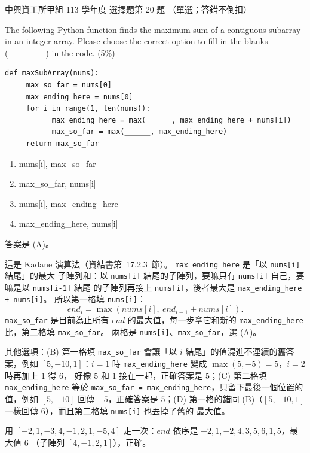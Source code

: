 \begin{pastexam}[label={px:nchu-113-dsa-20}]{中興資工所甲組 113 學年度 選擇題第 20 題}
（單選；答錯不倒扣）

The following Python function finds the maximum sum of a contiguous subarray in an integer array. Please
choose the correct option to fill in the blanks (\_\_\_\_\_\_) in the code. (5\%)
\begin{verbatim}
def maxSubArray(nums):
     max_so_far = nums[0]
     max_ending_here = nums[0]
     for i in range(1, len(nums)):
           max_ending_here = max(______, max_ending_here + nums[i])
           max_so_far = max(______, max_ending_here)
     return max_so_far
\end{verbatim}
\begin{enumerate}[label=(\Alph*)]
\item nums[i], max\_so\_far
\item max\_so\_far, nums[i]
\item nums[i], max\_ending\_here
\item max\_ending\_here, nums[i]
\end{enumerate}
\end{pastexam}

\begin{pastsoln}
答案是 (A)。

這是 Kadane 演算法（資結書第~17.2.3~節）。 \texttt{max\_ending\_here} 是「以 \texttt{nums[i]} 結尾」的最大
子陣列和：以 \texttt{nums[i]} 結尾的子陣列，要嘛只有 \texttt{nums[i]} 自己，要嘛是以 \texttt{nums[i-1]} 結尾
的子陣列再接上 \texttt{nums[i]}，後者最大是 \texttt{max\_ending\_here + nums[i]}。 所以第一格填
\texttt{nums[i]}：
\[
\mathit{end}_i = \max(\mathit{nums}[i],\ \mathit{end}_{i-1} + \mathit{nums}[i]).
\]
\texttt{max\_so\_far} 是目前為止所有 $\mathit{end}$ 的最大值，每一步拿它和新的 \texttt{max\_ending\_here}
比，第二格填 \texttt{max\_so\_far}。 兩格是 \texttt{nums[i]}、\texttt{max\_so\_far}，選 (A)。

其他選項：(B) 第一格填 \texttt{max\_so\_far} 會讓「以 $i$ 結尾」的值混進不連續的舊答案，例如
$[5, -10, 1]$：$i = 1$ 時 \texttt{max\_ending\_here} 變成 $\max(5, -5) = 5$，$i = 2$ 時再加上 $1$ 得 $6$，
好像 $5$ 和 $1$ 接在一起，正確答案是 $5$；(C) 第二格填
\texttt{max\_ending\_here} 等於 \texttt{max\_so\_far = max\_ending\_here}，只留下最後一個位置的值，例如
$[5, -10]$ 回傳 $-5$，正確答案是 $5$；(D) 第一格的錯同 (B)（$[5, -10, 1]$ 一樣回傳 $6$），而且第二格填 \texttt{nums[i]} 也丟掉了舊的
最大值。

用 $[-2, 1, -3, 4, -1, 2, 1, -5, 4]$ 走一次：$\mathit{end}$ 依序是 $-2, 1, -2, 4, 3, 5, 6, 1, 5$，最大值 $6$
（子陣列 $[4, -1, 2, 1]$），正確。
\end{pastsoln}
